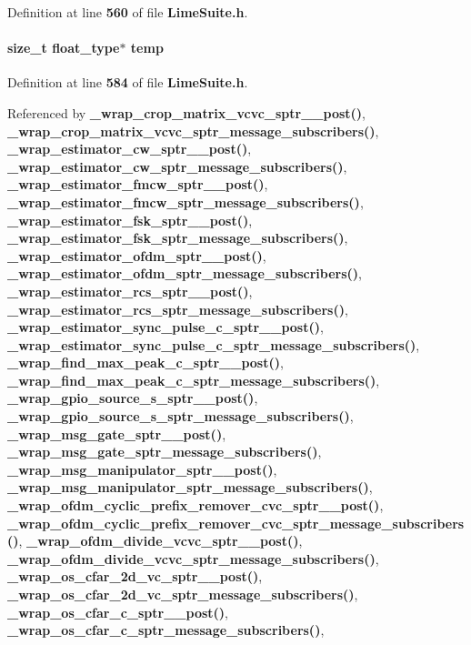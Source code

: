 Definition at line {\bf 560} of file {\bf Lime\+Suite.\+h}.

\paragraph[{temp}]{\setlength{\rightskip}{0pt plus 5cm}size\+\_\+t {\bf float\+\_\+type}$\ast$ temp}\label{group__FN__HIGH__LVL_ga063a5e50e4b36623eeebf0d5121a065a}


Definition at line {\bf 584} of file {\bf Lime\+Suite.\+h}.



Referenced by {\bf \+\_\+wrap\+\_\+crop\+\_\+matrix\+\_\+vcvc\+\_\+sptr\+\_\+\+\_\+post()}, {\bf \+\_\+wrap\+\_\+crop\+\_\+matrix\+\_\+vcvc\+\_\+sptr\+\_\+message\+\_\+subscribers()}, {\bf \+\_\+wrap\+\_\+estimator\+\_\+cw\+\_\+sptr\+\_\+\+\_\+post()}, {\bf \+\_\+wrap\+\_\+estimator\+\_\+cw\+\_\+sptr\+\_\+message\+\_\+subscribers()}, {\bf \+\_\+wrap\+\_\+estimator\+\_\+fmcw\+\_\+sptr\+\_\+\+\_\+post()}, {\bf \+\_\+wrap\+\_\+estimator\+\_\+fmcw\+\_\+sptr\+\_\+message\+\_\+subscribers()}, {\bf \+\_\+wrap\+\_\+estimator\+\_\+fsk\+\_\+sptr\+\_\+\+\_\+post()}, {\bf \+\_\+wrap\+\_\+estimator\+\_\+fsk\+\_\+sptr\+\_\+message\+\_\+subscribers()}, {\bf \+\_\+wrap\+\_\+estimator\+\_\+ofdm\+\_\+sptr\+\_\+\+\_\+post()}, {\bf \+\_\+wrap\+\_\+estimator\+\_\+ofdm\+\_\+sptr\+\_\+message\+\_\+subscribers()}, {\bf \+\_\+wrap\+\_\+estimator\+\_\+rcs\+\_\+sptr\+\_\+\+\_\+post()}, {\bf \+\_\+wrap\+\_\+estimator\+\_\+rcs\+\_\+sptr\+\_\+message\+\_\+subscribers()}, {\bf \+\_\+wrap\+\_\+estimator\+\_\+sync\+\_\+pulse\+\_\+c\+\_\+sptr\+\_\+\+\_\+post()}, {\bf \+\_\+wrap\+\_\+estimator\+\_\+sync\+\_\+pulse\+\_\+c\+\_\+sptr\+\_\+message\+\_\+subscribers()}, {\bf \+\_\+wrap\+\_\+find\+\_\+max\+\_\+peak\+\_\+c\+\_\+sptr\+\_\+\+\_\+post()}, {\bf \+\_\+wrap\+\_\+find\+\_\+max\+\_\+peak\+\_\+c\+\_\+sptr\+\_\+message\+\_\+subscribers()}, {\bf \+\_\+wrap\+\_\+gpio\+\_\+source\+\_\+s\+\_\+sptr\+\_\+\+\_\+post()}, {\bf \+\_\+wrap\+\_\+gpio\+\_\+source\+\_\+s\+\_\+sptr\+\_\+message\+\_\+subscribers()}, {\bf \+\_\+wrap\+\_\+msg\+\_\+gate\+\_\+sptr\+\_\+\+\_\+post()}, {\bf \+\_\+wrap\+\_\+msg\+\_\+gate\+\_\+sptr\+\_\+message\+\_\+subscribers()}, {\bf \+\_\+wrap\+\_\+msg\+\_\+manipulator\+\_\+sptr\+\_\+\+\_\+post()}, {\bf \+\_\+wrap\+\_\+msg\+\_\+manipulator\+\_\+sptr\+\_\+message\+\_\+subscribers()}, {\bf \+\_\+wrap\+\_\+ofdm\+\_\+cyclic\+\_\+prefix\+\_\+remover\+\_\+cvc\+\_\+sptr\+\_\+\+\_\+post()}, {\bf \+\_\+wrap\+\_\+ofdm\+\_\+cyclic\+\_\+prefix\+\_\+remover\+\_\+cvc\+\_\+sptr\+\_\+message\+\_\+subscribers()}, {\bf \+\_\+wrap\+\_\+ofdm\+\_\+divide\+\_\+vcvc\+\_\+sptr\+\_\+\+\_\+post()}, {\bf \+\_\+wrap\+\_\+ofdm\+\_\+divide\+\_\+vcvc\+\_\+sptr\+\_\+message\+\_\+subscribers()}, {\bf \+\_\+wrap\+\_\+os\+\_\+cfar\+\_\+2d\+\_\+vc\+\_\+sptr\+\_\+\+\_\+post()}, {\bf \+\_\+wrap\+\_\+os\+\_\+cfar\+\_\+2d\+\_\+vc\+\_\+sptr\+\_\+message\+\_\+subscribers()}, {\bf \+\_\+wrap\+\_\+os\+\_\+cfar\+\_\+c\+\_\+sptr\+\_\+\+\_\+post()}, {\bf \+\_\+wrap\+\_\+os\+\_\+cfar\+\_\+c\+\_\+sptr\+\_\+message\+\_\+subscribers()}, 